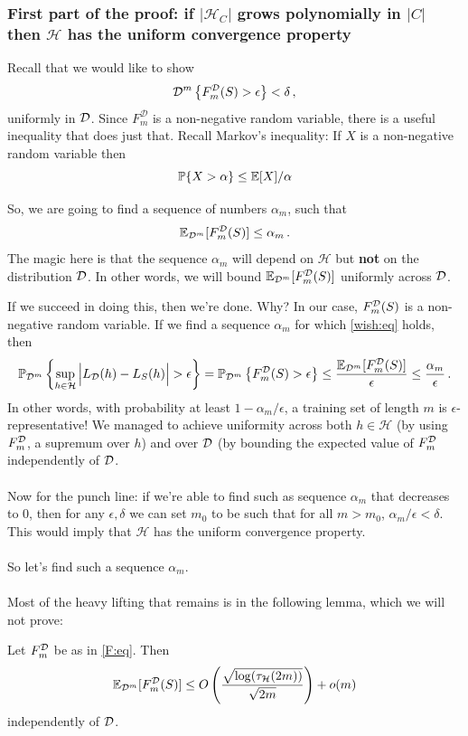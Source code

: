 \documentclass[11pt]{article}
\newcommand{\Prob}{\ensuremath{\mathbb{P}}}
\newcommand{\Dc}{\mathcal{D}}
\newcommand{\Hc}{\mathcal{H}}
\begin{document}
\subsubsection{First part of the proof: 
if 
\bf $|\Hc_C|$ grows polynomially in $|C|$ then
  $\Hc$ has the uniform convergence property}

Recall that we would like to show
\[
  \D^m\left\{ F_m^\Dc(S)>\epsilon \right\} < \delta\,,
\]
uniformly in $\mathcal{D}$.
Since $F^\Dc_m$ is a non-negative random variable, there is a useful inequality
that does just that. Recall Markov's inequality:
If $X$ is a non-negative random variable then 
\[
    \Prob\{X>\alpha\}\leq \E[X]/\alpha
\]

So, we are going to find a sequence of numbers $\alpha_m$,
such that 
\begin{eqnarray} \label{wish:eq}
    \mathbb{E}_{\mathcal{D}^m}[F^{\mathcal{D}}_m(S)] \leq \alpha_m \,.
\end{eqnarray}
The magic here is that the sequence $\alpha_m$ will depend on $\Hc$ but {\bf
not} on the distribution $\mathcal{D}$. In other words, we will bound
$\mathbb{E}_{\mathcal{D}^m}[F^{\mathcal{D}}_m(S)]$ uniformly across $\mathcal{D}$. 

If we succeed in doing this, then we're done. Why?
In our case, $F^{\mathcal{D}}_m(S)$ is a non-negative random variable. If we find a sequence
$\alpha_m$ for which 
\eqref{wish:eq} holds, then
\[
    \Prob_{\D^m} \left\{  \sup_{h\in\Hc} \Big| L_\D(h) - L_S(h) \Big| >
    \epsilon \right\} =
    \Prob_{\D^m} \left\{ F^\D_m(S)>\epsilon \right\} \leq 
    \frac{\E_{\D^m}[F^\D_m(S)]}{ \epsilon} \leq \frac{\alpha_m}{\epsilon}\,.
\]
In other words, with probability at least $1-\alpha_m/\epsilon$, a training set
of length $m$ is $\epsilon$-representative! We managed to achieve uniformity
across both $h\in\Hc$ (by using $F^{\mathcal{D}}_m$, a supremum over $h$) and over $\mathcal{D}$
(by bounding the expected value of $F^{\mathcal{D}}_m$ independently of $\mathcal{D}$. 
\\~\\
Now for the punch line: if we're able to find such as sequence $\alpha_m$ that
decreases to $0$, then for any $\epsilon,\delta$ we can set $m_0$ to be such that for
all $m>m_0$, $\alpha_m/\epsilon<\delta$. This would imply that $\Hc$ has the
uniform convergence property.
\\~\\
So let's find such a sequence $\alpha_m$. 
\\~\\
Most of the heavy lifting that remains is in the following lemma, which we will
not prove:
\begin{lemma} \label{F:lem}
    Let $F_m^{\mathcal{D}}$ be as in \eqref{F:eq}.    Then
    \[
        \E_{\D^m} [F_m^\Dc(S)] \leq  
        O\left(\frac{ \sqrt{\log(\tau_\Hc(2m))}} {\sqrt{2m}}\right) +o(m)
    \]
    independently of $\mathcal{D}$.
\end{lemma}
\end{document}
